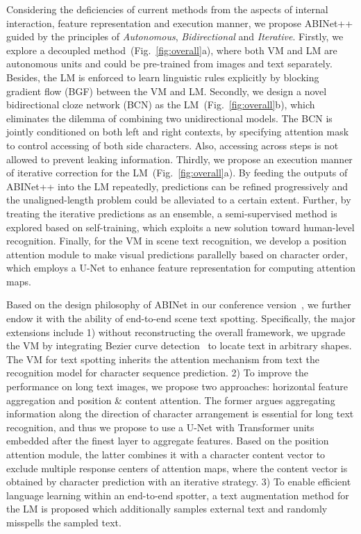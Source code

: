 \documentclass[10pt,journal,compsoc]{IEEEtran}
\begin{document}
Considering the deficiencies of current methods from the aspects of internal interaction, feature representation and execution manner, we propose ABINet++ guided by the principles of \emph{Autonomous}, \emph{Bidirectional} and \emph{Iterative}. Firstly, we explore a decoupled method~(Fig.~\ref{fig:overall}a), where both VM and LM are autonomous units and could be pre-trained from images and text separately. Besides, the LM is enforced to learn linguistic rules explicitly by blocking gradient flow (BGF) between the VM and LM. Secondly, we design a novel bidirectional cloze network (BCN) as the LM~(Fig.~\ref{fig:overall}b), which eliminates the dilemma of combining two unidirectional models. The BCN is jointly conditioned on both left and right contexts, by specifying attention mask to control accessing of both side characters. Also, accessing across steps is not allowed to prevent leaking information. Thirdly, we propose an execution manner of iterative correction for the LM~(Fig.~\ref{fig:overall}a). By feeding the outputs of ABINet++ into the LM repeatedly, predictions can be refined progressively and the unaligned-length problem could be alleviated to a certain extent. Further, by treating the iterative predictions as an ensemble, a semi-supervised method is explored based on self-training, which exploits a new solution toward human-level recognition. Finally, for the VM in scene text recognition, we develop a position attention module to make visual predictions parallelly based on character order, which employs a U-Net to enhance feature representation for computing attention maps.


Based on the design philosophy of ABINet in our conference version~\cite{fang2021read}, we further endow it with the ability of end-to-end scene text spotting. Specifically, the major extensions include 1) without reconstructing the overall framework, we upgrade the VM by integrating Bezier curve detection~\cite{liu2020abcnet} to locate text in arbitrary shapes. The VM for text spotting inherits the attention mechanism from text the recognition model for character sequence prediction. 2) To improve the performance on long text images, we propose two approaches: horizontal feature aggregation and position \& content attention. The former argues aggregating information along the direction of character arrangement is essential for long text recognition, and thus we propose to use a U-Net with Transformer units embedded after the finest layer to aggregate features. Based on the position attention module, the latter combines it with a character content vector to exclude multiple response centers of attention maps, where the content vector is obtained by character prediction with an iterative strategy. 3) To enable efficient language learning within an end-to-end spotter, a text augmentation method for the LM is proposed which additionally samples external text and randomly misspells the sampled text.
\end{document}
